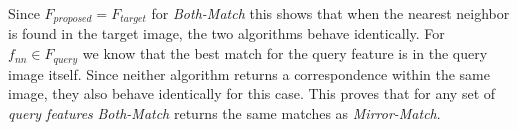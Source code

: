 \documentclass[10pt,journal,cspaper,compsoc]{IEEEtran}
\begin{document}
Since $F_{proposed} = F_{target}$ for \emph{Both-Match} this shows that
when the nearest neighbor is found in the target image, the two 
algorithms behave identically. For $f_{nn} \in F_{query}$ we know that 
the best match for the query feature is in the query image itself. Since 
neither algorithm returns a correspondence within the same image, they 
also behave identically for this case. This proves that for any set of 
\emph{query features} \emph{Both-Match} returns the same matches as 
\emph{Mirror-Match}.

\balance


\end{document}
